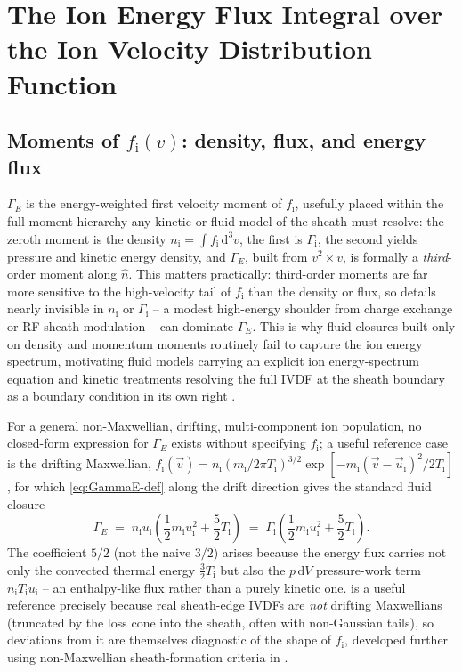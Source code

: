 \section{The Ion Energy Flux Integral over the Ion Velocity Distribution Function}

\subsection{Moments of \texorpdfstring{$f_{\mathrm{i}}(v)$}{f\_i(v)}: density, flux, and energy flux}

$\Gamma_{E}$ is the energy-weighted first velocity moment of $f_{\mathrm{i}}$, usefully placed within the full moment hierarchy any kinetic or fluid model of the sheath must resolve: the zeroth moment is the density $n_{\mathrm{i}} = \int f_{\mathrm{i}}\, \mathrm{d}^3 v$, the first is $\Gamma_{\mathrm{i}}$, the second yields pressure and kinetic energy density, and $\Gamma_{E}$, built from $v^2 \times v$, is formally a \emph{third}-order moment along $\hat n$. This matters practically: third-order moments are far more sensitive to the high-velocity tail of $f_{\mathrm{i}}$ than the density or flux, so details nearly invisible in $n_{\mathrm{i}}$ or $\Gamma_{\mathrm{i}}$ -- a modest high-energy shoulder from charge exchange or RF sheath modulation -- can dominate $\Gamma_{E}$. This is why fluid closures built only on density and momentum moments routinely fail to capture the ion energy spectrum, motivating fluid models carrying an explicit ion energy-spectrum equation \cite{ref0083} and kinetic treatments resolving the full IVDF at the sheath boundary as a boundary condition in its own right \cite{ref0119}.

For a general non-Maxwellian, drifting, multi-component ion population, no closed-form expression for $\Gamma_{E}$ exists without specifying $f_{\mathrm{i}}$; a useful reference case is the drifting Maxwellian, $f_{\mathrm{i}}(\vec v) = n_{\mathrm{i}} \left(m_{\mathrm{i}}/2\pi T_{\mathrm{i}}\right)^{3/2} \exp\!\left[-m_{\mathrm{i}}(\vec v - \vec u_{\mathrm{i}})^2/2T_{\mathrm{i}}\right]$, for which \cref{eq:GammaE-def} along the drift direction gives the standard fluid closure
\begin{equation}
\Gamma_{E} \;=\; n_{\mathrm{i}} u_{\mathrm{i}} \left(\frac{1}{2} m_{\mathrm{i}} u_{\mathrm{i}}^2 + \frac{5}{2} T_{\mathrm{i}}\right) \;=\; \Gamma_{\mathrm{i}} \left(\frac{1}{2} m_{\mathrm{i}} u_{\mathrm{i}}^2 + \frac{5}{2} T_{\mathrm{i}}\right).
\label{eq:GammaE-drifting-maxwellian}
\end{equation}
The coefficient $5/2$ (not the naive $3/2$) arises because the energy flux carries not only the convected thermal energy $\tfrac32 T_{\mathrm{i}}$ but also the $p\,\mathrm{d}V$ pressure-work term $n_{\mathrm{i}} T_{\mathrm{i}} u_{\mathrm{i}}$ -- an enthalpy-like flux rather than a purely kinetic one.  is a useful reference precisely because real sheath-edge IVDFs are \emph{not} drifting Maxwellians (truncated by the loss cone into the sheath, often with non-Gaussian tails), so deviations from it are themselves diagnostic of the shape of $f_{\mathrm{i}}$, developed further using non-Maxwellian sheath-formation criteria in \cite{ref0090}.


